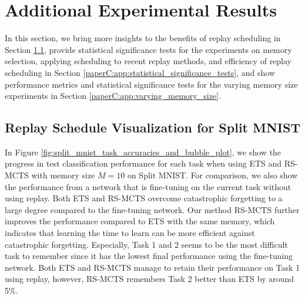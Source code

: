 
\section{Additional Experimental Results}
\label{paperC:app:additional_experimental_results}

In this section, we bring more insights to the benefits of replay scheduling in Section \ref{paperC:app:replay_schedule_visualization_for_split_mnist}, provide statistical significance tests for the experiments on memory selection, applying scheduling to recent replay methods, and efficiency of replay scheduling in Section \ref{paperC:app:statistical_significance_tests}, and show performance metrics and statistical significance tests for the varying memory size experiments in Section \ref{paperC:app:varying_memory_size}. 

\subsection{Replay Schedule Visualization for Split MNIST}
\label{paperC:app:replay_schedule_visualization_for_split_mnist}

In Figure \ref{fig:split_mnist_task_accuracies_and_bubble_plot}, we show the progress in test classification performance for each task when using ETS and RS-MCTS with memory size $M=10$ on Split MNIST. For comparison, we also show the performance from a network that is fine-tuning on the current task without using replay. Both ETS and RS-MCTS overcome catastrophic forgetting to a large degree compared to the fine-tuning network. Our method RS-MCTS further improves the performance compared to ETS with the same memory, which indicates that learning the time to learn can be more efficient against catastrophic forgetting. Especially, Task 1 and 2 seems to be the most difficult task to remember since it has the lowest final performance using the fine-tuning network. Both ETS and RS-MCTS manage to retain their performance on Task 1 using replay, however, RS-MCTS remembers Task 2 better than ETS by around 5\%. 

